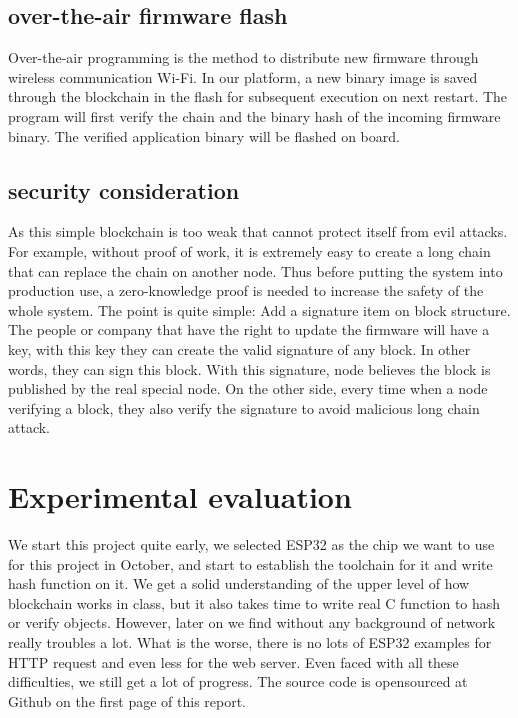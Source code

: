 \documentclass{article}
\begin{document}
    \subsection{over-the-air firmware flash}
        Over-the-air programming is the method to distribute new firmware through wireless communication Wi-Fi. In our platform, a new binary image is saved through the blockchain in the flash for subsequent execution on next restart. The program will first verify the chain and the binary hash of the incoming firmware binary. The verified application binary will be flashed on board.

    \subsection{security consideration}
        As this simple blockchain is too weak that cannot protect itself from evil attacks. For example, without proof of work, it is extremely easy to create a long chain that can replace the chain on another node. Thus before putting the system into production use, a zero-knowledge proof is needed to increase the safety of the whole system.
        The point is quite simple: Add a signature item on block structure. The people or company that have the right to update the firmware will have a key, with this key they can create the valid signature of any block. In other words, they can sign this block. With this signature, node believes the block is published by the real special node.
        On the other side, every time when a node verifying a block, they also verify the signature to avoid malicious long chain attack.

\section{Experimental evaluation}
    We start this project quite early, we selected ESP32 as the chip we want to use for this project in October, and start to establish the toolchain for it and write hash function on it. We get a solid understanding of the upper level of how blockchain works in class, but it also takes time to write real C function to hash or verify objects.
    However, later on we find without any background of network really troubles a lot. What is the worse, there is no lots of ESP32 examples for HTTP request and even less for the web server.
    Even faced with all these difficulties, we still get a lot of progress. The source code is opensourced at Github on the first page of this report.
\end{document}
